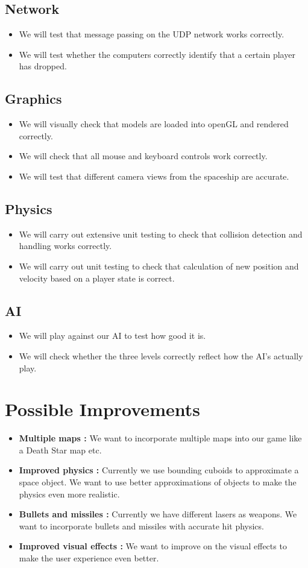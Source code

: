 \documentclass[]{article}
\begin{document}
\subsection{Network}
\begin{itemize}
\item We will test that message passing on the UDP network works correctly.
\item We will test whether the computers correctly identify that a certain player has dropped.
\end{itemize}
\subsection{Graphics}
\begin{itemize}
\item We will visually check that models are loaded into openGL and rendered correctly.
\item We will check that all mouse and keyboard controls work correctly.
\item We will test that different camera views from the spaceship are accurate.
\end{itemize}
\subsection{Physics}
\begin{itemize}
\item We will carry out extensive unit testing to check that collision detection and handling works correctly.
\item We will carry out unit testing to check that calculation of new position and velocity based on a player state is correct.
\end{itemize}
\subsection{AI}
\begin{itemize}
\item We will play against our AI to test how good it is.
\item We will check whether the three levels correctly reflect how the AI's actually play.
\end{itemize}
\section{Possible Improvements}
\begin{itemize}
\item \textbf{Multiple maps : } We want to incorporate multiple maps into our game like a Death Star map etc.
\item \textbf{Improved physics : } Currently we use bounding cuboids to approximate a space object. We want to use better approximations of objects to make the physics even more realistic.
\item \textbf{Bullets and missiles : } Currently we have different lasers as weapons. We want to incorporate bullets and missiles with accurate hit physics.
\item \textbf{Improved visual effects : } We want to improve on the visual effects to make the user experience even better.
\end{itemize}
\end{document}

